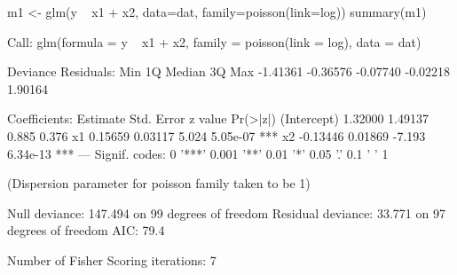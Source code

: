 \begin{Schunk}
\begin{Sinput}
 m1 <- glm(y ~ x1 + x2, data=dat, family=poisson(link=log))
 summary(m1)
\end{Sinput}
\begin{Soutput}
Call:
glm(formula = y ~ x1 + x2, family = poisson(link = log), data = dat)

Deviance Residuals: 
     Min        1Q    Median        3Q       Max  
-1.41361  -0.36576  -0.07740  -0.02218   1.90164  

Coefficients:
            Estimate Std. Error z value Pr(>|z|)    
(Intercept)  1.32000    1.49137   0.885    0.376    
x1           0.15659    0.03117   5.024 5.05e-07 ***
x2          -0.13446    0.01869  -7.193 6.34e-13 ***
---
Signif. codes:  0 '***' 0.001 '**' 0.01 '*' 0.05 '.' 0.1 ' ' 1

(Dispersion parameter for poisson family taken to be 1)

    Null deviance: 147.494  on 99  degrees of freedom
Residual deviance:  33.771  on 97  degrees of freedom
AIC: 79.4

Number of Fisher Scoring iterations: 7
\end{Soutput}
\end{Schunk}
